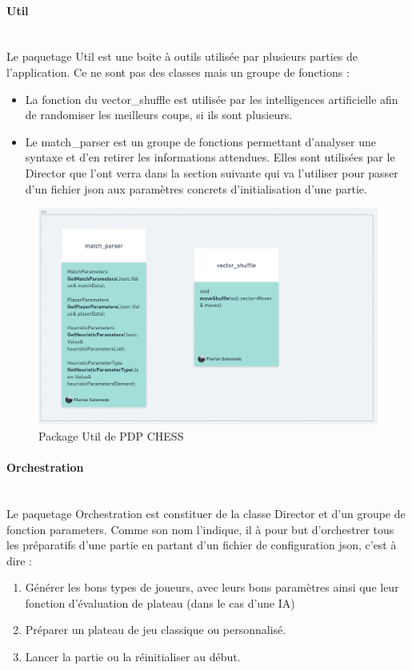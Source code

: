 \huge\documentclass{article}
\begin{document}
    \paragraph{Util}
    ~~\\
    \newline
    Le paquetage Util est une boite à outils utilisée par plusieurs parties de l'application. Ce ne sont pas des classes mais un groupe de fonctions :
    \begin{itemize}
        \item La fonction du vector\_shuffle est utilisée par les intelligences artificielle afin de randomiser les meilleurs coups, si ils sont plusieurs.
        \item Le match\_parser est un groupe de fonctions permettant d'analyser une syntaxe et d'en retirer les informations attendues. Elles sont utilisées par le Director que l'ont verra dans la section suivante qui va l'utiliser pour passer d'un fichier json aux paramètres concrets d'initialisation d'une partie.
    \end{itemize}
    \begin{figure}[!h]
        \centering
        \includegraphics[scale = 0.3]{img/Package/Util.png}
        \caption{Package Util de PDP CHESS}
        \label{pck:util}
    \end{figure}
    \paragraph{Orchestration}
    ~~\\
    \newline
    Le paquetage Orchestration est constituer de la classe Director et d'un groupe de fonction parameters. Comme son nom l'indique, il à pour but d'orchestrer tous les préparatifs d'une partie en partant d'un fichier de configuration json, c'est à dire :
    \begin{enumerate}
        \item Générer les bons types de joueurs, avec leurs bons paramètres ainsi que leur fonction d'évaluation de plateau (dans le cas d'une IA)
        \item Préparer un plateau de jeu classique ou personnalisé.
        \item Lancer la partie ou la réinitialiser au début.
    \end{enumerate}
\end{document}

